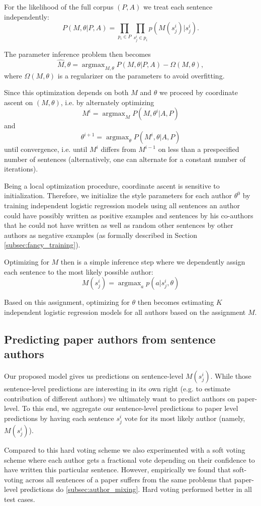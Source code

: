 For the likelihood of the full corpus $(P,A)$ we treat each sentence independently:
$$P(M,\theta | P,A) = \prod_{p_i \in P} \prod_{s_j^i \in p_i} p(M(s_j^i) | s_j^i).$$

The parameter inference problem then becomes
$$\hat{M},\hat{\theta} = \operatorname{argmax}_{M,\theta} P(M,\theta | P,A) - \Omega(M,\theta),$$
where $\Omega(M,\theta)$ is a regularizer on the parameters to avoid overfitting.

Since this optimization depends on both $M$ and $\theta$ we proceed by coordinate ascent on $(M, \theta)$, i.e. by alternately optimizing
$$M^i = \operatorname{argmax}_{M} P(M,\theta^i|A,P)$$
and
$$\theta^{i+1} = \operatorname{argmax}_{\theta} P(M^i,\theta|A,P)$$
until convergence, i.e. until $M^i$ differs from $M^{i-1}$ on less than a prespecified number of sentences (alternatively, one can alternate for a constant number of iterations).

Being a local optimization procedure, coordinate ascent is sensitive to initialization.
Therefore, we initialize the style parameters for each author $\theta^{0}$ by training independent logistic regression models using all sentences an author could have possibly written as positive examples and sentences by his co-authors that he could not have written as well as random other sentences by other authors as negative examples (as formally described in Section \ref{subsec:fancy_training}).

Optimizing for $M$ then is a simple inference step where we dependently assign each sentence to the most likely possible author:
$$M(s_j^i) = \operatorname{argmax}_{a} p(a|s_j^i, \theta)$$

Based on this assignment, optimizing for $\theta$ then becomes estimating $K$ independent logistic regression models for all authors based on the assignment $M$.


\subsection{Predicting paper authors from sentence authors}
Our proposed model gives us predictions on sentence-level $M(s_j^i)$.
While those sentence-level predictions are interesting in its own right (e.g. to estimate contribution of different authors) we ultimately want to predict authors on paper-level.
To this end, we aggregate our sentence-level predictions to paper level predictions by having each sentence $s_j^i$ vote for its most likely author (namely, $M(s_j^i)$).

Compared to this hard voting scheme we also experimented with a soft voting scheme where each author gets a fractional vote depending on their confidence to have written this particular sentence.
However, empirically we found that soft-voting across all sentences of a paper suffers from the same problems that paper-level predictions do \ref{subsec:author_mixing}. 
Hard voting performed better in all test cases.
